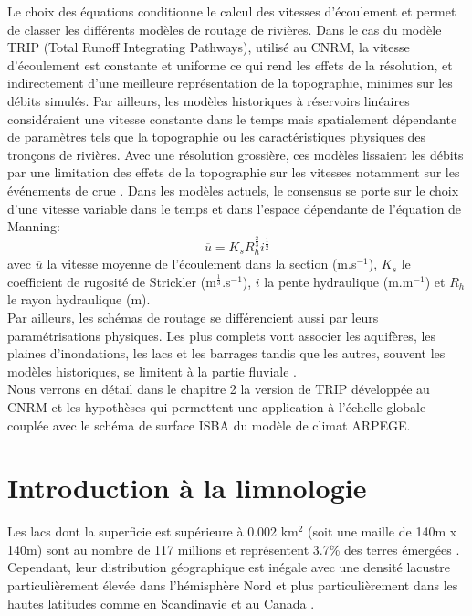 \noindent Le choix des équations conditionne le calcul des vitesses d'écoulement et permet de classer les différents modèles de routage de rivières. Dans le cas du modèle TRIP (Total Runoff Integrating Pathways), utilisé au CNRM, la vitesse d'écoulement est constante et uniforme ce qui rend les effets de la résolution, et indirectement d'une meilleure représentation de la topographie, minimes sur les débits simulés. Par ailleurs, les modèles historiques à réservoirs linéaires considéraient une vitesse constante dans le temps mais spatialement dépendante de paramètres tels que la topographie ou les caractéristiques physiques des tronçons de rivières. Avec une résolution grossière, ces modèles lissaient les débits par une limitation des effets de la topographie sur les vitesses notamment sur les événements de crue \citep{vorosmarty1989}. Dans les modèles actuels, le consensus se porte sur le choix d'une vitesse variable dans le temps et dans l'espace dépendante de l'équation de Manning: \begin{equation}
\overline{u} = K_{s}R_{h}^{\frac{2}{3}}i^{\frac{1}{2}}
\end{equation}
avec $\overline{u}$ la vitesse moyenne de l'écoulement dans la section (m.s$^{-1}$), $K_{s}$ le coefficient de rugosité de Strickler (m$^{\frac{1}{3}}$.s$^{-1}$), $i$ la pente hydraulique (m.m$^{-1}$) et $R_{h}$ le rayon hydraulique (m).\\

Par ailleurs, les schémas de routage se différencient aussi par leurs paramétrisations physiques. Les plus complets vont associer les aquifères, les plaines d'inondations, les lacs et les barrages \citep{hanasaki2006, lam2011,yamazaki2011, burek2013, decharme2019} tandis que les autres, souvent les modèles historiques, se limitent à la partie fluviale \citep{vorosmarty1989,coe1998}.\\

\noindent Nous verrons en détail dans le chapitre 2 la version de TRIP développée au CNRM et les hypothèses qui permettent une application à l'échelle globale couplée avec le schéma de surface ISBA du modèle de climat ARPEGE.

\section{{\selectfont Introduction à la limnologie}}
\label{sec:limnologie}

Les lacs dont la superficie est supérieure à 0.002 km$^{2}$ (soit une maille de 140m x 140m) sont au nombre de 117 millions et représentent 3.7\% des terres émergées \citep{verpoorter2014}. Cependant, leur distribution géographique est inégale avec une densité lacustre particulièrement élevée dans l’hémisphère Nord et plus particulièrement dans les hautes latitudes comme en Scandinavie et au Canada \citep[Figure \ref{hydrolakes}]{downing2006}. \\

